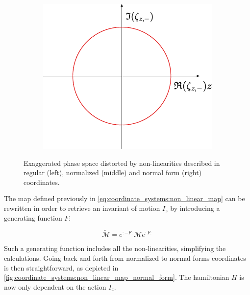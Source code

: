 \begin{figure}[H]
\begin{subfigure}[b]{0.292\textwidth}
    \end{subfigure}
    \begin{subfigure}[b]{0.316\textwidth}
        \includegraphics[width=\linewidth]{images/phase_space_normal_form_coordinates.pdf}
    \end{subfigure}
    \caption{Exaggerated phase space distorted by non-linearities described in regular (left),
    normalized (middle) and normal form (right) coordinates.}
    \label{fig:coordinate_systems:distorted_phase_space}
\end{figure}

The map defined previously in \cref{eq:coordinate_systems:non_linear_map} can be rewritten in order
to retrieve an invariant of motion $I_z$ by introducing a generating function $F$:

\begin{equation}
    \tilde{\mathcal{M}} = e^{:-F:} \mathcal{M} e^{:F:}
    \label{eq:coordinate_systems:non_linear_map_normal_form}
\end{equation}



Such a generating function includes all the non-linearities, simplifying the calculations.
Going back and forth from normalized to normal forms coordinates is then straightforward, as
depicted in \cref{fig:coordinate_systems:non_linear_map_normal_form}. The hamiltonian $H$ is now
only dependent on the action $I_z$.


